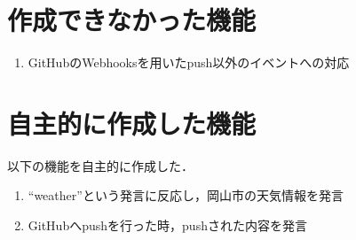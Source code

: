 \documentclass[fleqn, 14pt]{sty/extarticlej}
\begin{document}
\section{作成できなかった機能}
\begin{enumerate}
  \item GitHubのWebhooksを用いたpush以外のイベントへの対応
\end{enumerate}

\section{自主的に作成した機能}
以下の機能を自主的に作成した．
\begin{enumerate}
\item``weather''という発言に反応し，岡山市の天気情報を発言
\item GitHubへpushを行った時，pushされた内容を発言
\end{enumerate}
\end{document}
